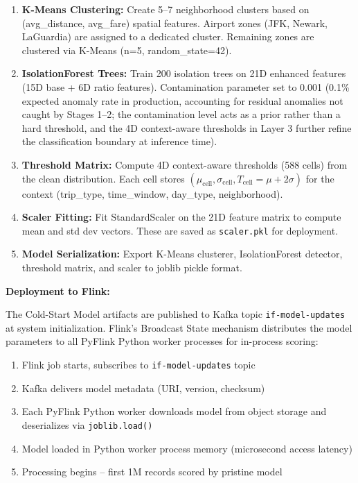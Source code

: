 \begin{enumerate}
    \item \textbf{K-Means Clustering:} Create 5--7 neighborhood clusters based on (avg\_distance, avg\_fare) spatial features. Airport zones (JFK, Newark, LaGuardia) are assigned to a dedicated cluster. Remaining zones are clustered via K-Means (n=5, random\_state=42).

    \item \textbf{IsolationForest Trees:} Train 200 isolation trees on 21D enhanced features (15D base + 6D ratio features). Contamination parameter set to 0.001 (0.1\% expected anomaly rate in production, accounting for residual anomalies not caught by Stages 1--2; the contamination level acts as a prior rather than a hard threshold, and the 4D context-aware thresholds in Layer 3 further refine the classification boundary at inference time).

    \item \textbf{Threshold Matrix:} Compute 4D context-aware thresholds (588 cells) from the clean distribution. Each cell stores $(\mu_{\text{cell}}, \sigma_{\text{cell}}, T_{\text{cell}} = \mu + 2\sigma)$ for the context (trip\_type, time\_window, day\_type, neighborhood).

    \item \textbf{Scaler Fitting:} Fit StandardScaler on the 21D feature matrix to compute mean and std dev vectors. These are saved as \texttt{scaler.pkl} for deployment.

    \item \textbf{Model Serialization:} Export K-Means clusterer, IsolationForest detector, threshold matrix, and scaler to joblib pickle format.
\end{enumerate}

\textbf{Deployment to Flink:}

The Cold-Start Model artifacts are published to Kafka topic \texttt{if-model-updates} at system initialization. Flink's Broadcast State mechanism distributes the model parameters to all PyFlink Python worker processes for in-process scoring:

\begin{enumerate}
    \item Flink job starts, subscribes to \texttt{if-model-updates} topic
    \item Kafka delivers model metadata (URI, version, checksum)
    \item Each PyFlink Python worker downloads model from object storage and deserializes via \texttt{joblib.load()}
    \item Model loaded in Python worker process memory (microsecond access latency)
    \item Processing begins -- first 1M records scored by pristine model
\end{enumerate}


